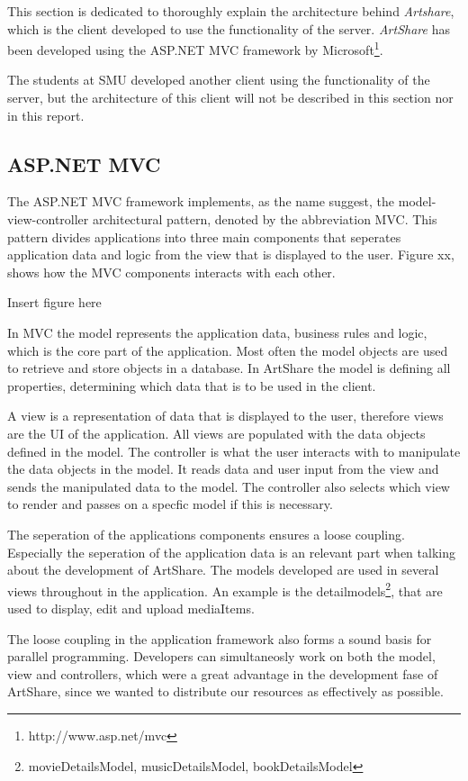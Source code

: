 \documentclass[../report.tex]{subfiles}
\begin{document}
This section is dedicated to thoroughly explain the architecture behind \textit{Artshare}, which is the client developed to use the functionality of the server. \textit{ArtShare} has been developed using the ASP.NET MVC framework by Microsoft\footnote{http://www.asp.net/mvc}. 

The students at SMU developed another client using the functionality of the server, but the architecture of this client will not be described in this section nor in this report.

\subsection{ASP.NET MVC}

The ASP.NET MVC framework implements, as the name suggest, the model-view-controller architectural pattern, denoted by the abbreviation MVC. This pattern divides applications into three main components that seperates application data and logic from the view that is displayed to the user. Figure xx, shows how the MVC components interacts with each other.

Insert figure here

In MVC the model represents the application data, business rules and logic, which is the core part of the application. Most often the model objects are used to retrieve and store objects in a database. In ArtShare the model is defining all properties, determining which data that is to be used in the client.

A view is a representation of data that is displayed to the user, therefore views are the UI of the application. All views are populated with the data objects defined in the model. The controller is what the user interacts with to manipulate the data objects in the model. It reads data and user input from the view and sends the manipulated data to the model. The controller also selects which view to render and passes on a specfic model if this is necessary.

The seperation of the applications components ensures a loose coupling. Especially the seperation of the application data is an relevant part when talking about the development of ArtShare. The models developed are used in several views throughout in the application. An example is the detailmodels\footnote{movieDetailsModel, musicDetailsModel, bookDetailsModel}, that are used to display, edit and upload mediaItems.

The loose coupling in the application framework also forms a sound basis for parallel programming. Developers can simultaneosly work on both the model, view and controllers, which were a great advantage in the development fase of ArtShare, since we wanted to distribute our resources as effectively as possible.
\end{document}
